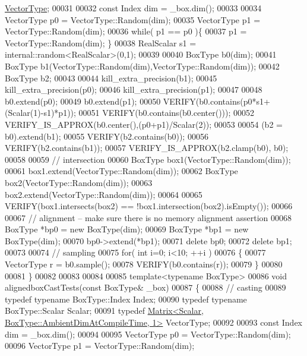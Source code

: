 \begin{DoxyCode}
       \hyperlink{struct_vector_type}{VectorType};
00031 
00032   \textcolor{keyword}{const} Index dim = \_box.dim();
00033 
00034   VectorType p0 = VectorType::Random(dim);
00035   VectorType p1 = VectorType::Random(dim);
00036   \textcolor{keywordflow}{while}( p1 == p0 )\{
00037       p1 =  VectorType::Random(dim); \}
00038   RealScalar s1 = internal::random<RealScalar>(0,1);
00039 
00040   BoxType b0(dim);
00041   BoxType b1(VectorType::Random(dim),VectorType::Random(dim));
00042   BoxType b2;
00043   
00044   kill\_extra\_precision(b1);
00045   kill\_extra\_precision(p0);
00046   kill\_extra\_precision(p1);
00047 
00048   b0.extend(p0);
00049   b0.extend(p1);
00050   VERIFY(b0.contains(p0*s1+(Scalar(1)-s1)*p1));
00051   VERIFY(b0.contains(b0.center()));
00052   VERIFY\_IS\_APPROX(b0.center(),(p0+p1)/Scalar(2));
00053 
00054   (b2 = b0).extend(b1);
00055   VERIFY(b2.contains(b0));
00056   VERIFY(b2.contains(b1));
00057   VERIFY\_IS\_APPROX(b2.clamp(b0), b0);
00058 
00059   \textcolor{comment}{// intersection}
00060   BoxType box1(VectorType::Random(dim));
00061   box1.extend(VectorType::Random(dim));
00062   BoxType box2(VectorType::Random(dim));
00063   box2.extend(VectorType::Random(dim));
00064 
00065   VERIFY(box1.intersects(box2) == !box1.intersection(box2).isEmpty()); 
00066 
00067   \textcolor{comment}{// alignment -- make sure there is no memory alignment assertion}
00068   BoxType *bp0 = \textcolor{keyword}{new} BoxType(dim);
00069   BoxType *bp1 = \textcolor{keyword}{new} BoxType(dim);
00070   bp0->extend(*bp1);
00071   \textcolor{keyword}{delete} bp0;
00072   \textcolor{keyword}{delete} bp1;
00073 
00074   \textcolor{comment}{// sampling}
00075   \textcolor{keywordflow}{for}( \textcolor{keywordtype}{int} i=0; i<10; ++i )
00076   \{
00077       VectorType r = b0.sample();
00078       VERIFY(b0.contains(r));
00079   \}
00080 
00081 \}
00082 
00083 
00084 
00085 \textcolor{keyword}{template}<\textcolor{keyword}{typename} BoxType>
00086 \textcolor{keywordtype}{void} alignedboxCastTests(\textcolor{keyword}{const} BoxType& \_box)
00087 \{
00088   \textcolor{comment}{// casting  }
00089   \textcolor{keyword}{typedef} \textcolor{keyword}{typename} BoxType::Index Index;
00090   \textcolor{keyword}{typedef} \textcolor{keyword}{typename} BoxType::Scalar Scalar;
00091   \textcolor{keyword}{typedef} \hyperlink{group___core___module_class_eigen_1_1_matrix}{Matrix<Scalar, BoxType::AmbientDimAtCompileTime, 1>}
       VectorType;
00092 
00093   \textcolor{keyword}{const} Index dim = \_box.dim();
00094 
00095   VectorType p0 = VectorType::Random(dim);
00096   VectorType p1 = VectorType::Random(dim);

\end{DoxyCode}
